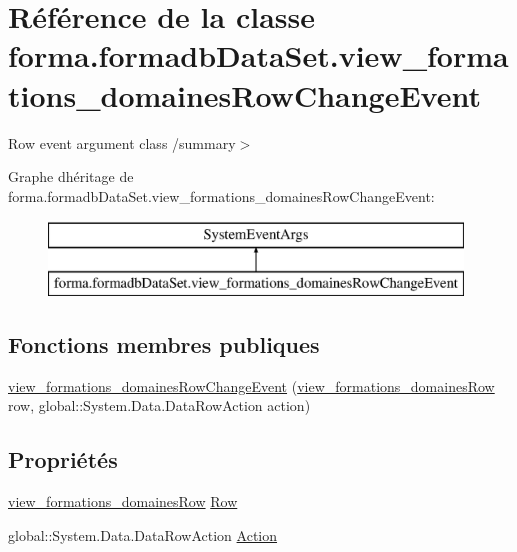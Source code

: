 \hypertarget{classforma_1_1formadb_data_set_1_1view__formations__domaines_row_change_event}{}\section{Référence de la classe forma.\+formadb\+Data\+Set.\+view\+\_\+formations\+\_\+domaines\+Row\+Change\+Event}
\label{classforma_1_1formadb_data_set_1_1view__formations__domaines_row_change_event}


Row event argument class /summary$>$  


Graphe d\textquotesingle{}héritage de forma.\+formadb\+Data\+Set.\+view\+\_\+formations\+\_\+domaines\+Row\+Change\+Event\+:\begin{figure}[H]
\begin{center}
\leavevmode
\includegraphics[height=2.000000cm]{classforma_1_1formadb_data_set_1_1view__formations__domaines_row_change_event}
\end{center}
\end{figure}
\subsection*{Fonctions membres publiques}
\begin{DoxyCompactItemize}
\item 
\hyperlink{classforma_1_1formadb_data_set_1_1view__formations__domaines_row_change_event_afdf9117d35603eaa7f6368435fa361ed}{view\+\_\+formations\+\_\+domaines\+Row\+Change\+Event} (\hyperlink{classforma_1_1formadb_data_set_1_1view__formations__domaines_row}{view\+\_\+formations\+\_\+domaines\+Row} row, global\+::\+System.\+Data.\+Data\+Row\+Action action)
\end{DoxyCompactItemize}
\subsection*{Propriétés}
\begin{DoxyCompactItemize}
\item 
\hyperlink{classforma_1_1formadb_data_set_1_1view__formations__domaines_row}{view\+\_\+formations\+\_\+domaines\+Row} \hyperlink{classforma_1_1formadb_data_set_1_1view__formations__domaines_row_change_event_a95bda62f4c66fafb277c385ab9f65620}{Row}
\item 
global\+::\+System.\+Data.\+Data\+Row\+Action \hyperlink{classforma_1_1formadb_data_set_1_1view__formations__domaines_row_change_event_a03e1cb3034c7db85e395d6d4aaf21d26}{Action}
\end{DoxyCompactItemize}


